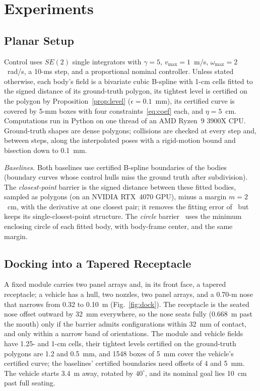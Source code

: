 \documentclass[journal]{IEEEtran}
\theoremstyle{definition}
\begin{document}
\section{Experiments}\label{sec:exp}

\subsection{Planar Setup}
Control uses $SE(2)$ single integrators with $\gamma=5$, $v_{\max}=1$~m/s, $\omega_{\max}=2$~rad/s,
a 10-ms step, and a proportional nominal controller. Unless stated otherwise, each body's field is a
bivariate cubic B-spline with 1-cm cells fitted to the signed distance of its ground-truth polygon,
its tightest level is certified on the polygon by Proposition~\ref{prop:level} ($\epsilon=0.1$~mm),
its certified curve is covered by 5-mm boxes with four constraints~\eqref{eq:coef} each, and
$\eta=5$~cm. Computations run in Python on one thread of an AMD Ryzen~9 3900X CPU. Ground-truth
shapes are dense polygons; collisions are checked at every step and, between steps, along the
interpolated poses with a rigid-motion bound and bisection down to 0.1~mm.

\emph{Baselines.} Both baselines use certified B-spline boundaries of the bodies~\cite{jo2027semantic}
(boundary curves whose control hulls miss the ground truth after subdivision). The \emph{closest-point}
barrier is the signed distance between these fitted bodies, sampled as polygons (on an NVIDIA RTX~4070
GPU), minus a margin $m=2$~cm, with the derivative at one closest pair; it removes the fitting error
of~\cite{jo2026geometry} but keeps its single-closest-point structure. The \emph{circle}
barrier~\cite{wang2017safety} uses the minimum enclosing circle of each fitted body, with body-frame
center, and the same margin.

\subsection{Docking into a Tapered Receptacle}\label{sec:exp-dock}
A fixed module carries two panel arrays and, in its front face, a tapered receptacle; a vehicle
has a hull, two nozzles, two panel arrays, and a 0.70-m nose that narrows from 0.32 to 0.10~m
(Fig.~\ref{fig:dock}). The receptacle is the seated nose offset outward by 32~mm everywhere, so the
nose seats fully (0.668~m past the mouth) only if the barrier admits configurations within 32~mm of
contact, and only within a narrow band of orientations. The module and vehicle fields have 1.25- and
1-cm cells, their tightest levels certified on the ground-truth polygons are 1.2 and 0.5~mm, and 1548
boxes of 5~mm cover the vehicle's certified curve; the baselines' certified boundaries need offsets
of 4 and 5~mm. The vehicle starts 3.4~m away, rotated by $40^\circ$, and its nominal goal lies 10~cm
past full seating.
\end{document}
